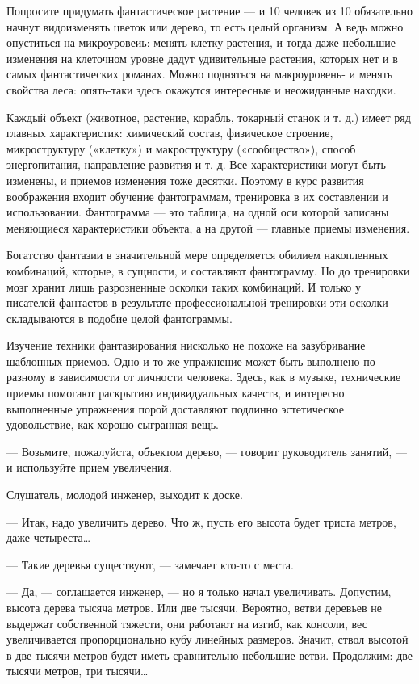 Попросите  придумать  фантастическое  растение  —  и  10  человек  из   10
обязательно начнут видоизменять цветок или дерево, то есть целый организм.
А ведь можно опуститься на  микроуровеиь: менять клетку растения, и  тогда
даже небольшие изменения на клеточном уровне дадут удивительные  растения,
которых  нет  и  в  самых  фантастических  романах.  Можно  подняться   на
макроуровень- и менять свойства леса: опять-таки здесь окажутся интересные
и неожиданные находки.

Каждый объект (животное, растение, корабль, токарный станок и т. д.) имеет
ряд  главных  характеристик:   химический  состав,  физическое   строение,
микроструктуру  («клетку»)   и   макроструктуру   («сообщество»),   способ
энергопитания, направление развития и т. д. Все характеристики могут  быть
изменены, и  приемов  изменения  тоже десятки.  Поэтому  в  курс  развития
воображения входит обучение  фантограммам, тренировка в  их составлении  и
использовании. Фантограмма —  это таблица, на  одной оси которой  записаны
меняющиеся характеристики объекта, а на другой — главные приемы изменения.

Богатство фантазии в  значительной мере  определяется обилием  накопленных
комбинаций,  которые,  в  сущности,   и  составляют  фантограмму.  Но   до
тренировки мозг  хранит  лишь  разрозненные осколки  таких  комбинаций.  И
только у писателей-фантастов в результате профессиональной тренировки  эти
осколки складываются в подобие целой фантограммы.

Изучение  техники  фантазирования  нисколько  не  похоже  на  зазубривание
шаблонных приемов. Одно и то же упражнение может быть выполнено по-разному
в зависимости  от  личности человека.  Здесь,  как в  музыке,  технические
приемы помогают раскрытию индивидуальных качеств, и интересно  выполненные
упражнения порой доставляют подлинно эстетическое удовольствие, как хорошо
сыгранная вещь.

— Возьмите, пожалуйста, объектом дерево, — говорит руководитель занятий, —
и используйте прием увеличения.

Слушатель, молодой инженер, выходит к доске.

— Итак,  надо увеличить  дерево.  Что ж,  пусть  его высота  будет  триста
метров, даже четыреста…

— Такие деревья существуют, — замечает кто-то с места.

— Да, — соглашается  инженер, — но я  только начал увеличивать.  Допустим,
высота дерева тысяча метров. Или  две тысячи. Вероятно, ветви деревьев  не
выдержат собственной  тяжести, они  работают на  изгиб, как  консоли,  вес
увеличивается  пропорционально  кубу  линейных  размеров.  Значит,   ствол
высотой в  две тысячи  метров будет  иметь сравнительно  небольшие  ветви.
Продолжим: две тысячи метров, три тысячи…

